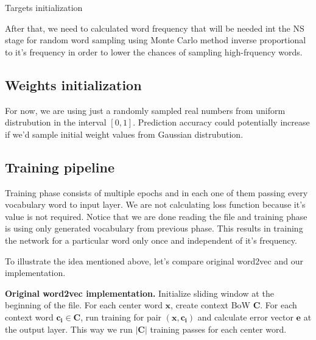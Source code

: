 \documentclass{article}
\newcommand{\SetAlgoStyle}{
	\SetAlgoNoLine
	\SetAlgoNoEnd
	\DontPrintSemicolon
}
\begin{document}
\begin{algorithm}[H]
	\caption{Targets initialization}
	\SetAlgoStyle
\end{algorithm}

\medbreak

After that, we need to calculated word frequency that will be needed
int the NS stage for random word sampling using Monte Carlo method inverse
proportional to it's frequency in order to lower the chances of sampling
high-frquency words.

\subsection{Weights initialization}

For now, we are using just a randomly sampled real numbers from uniform distrubution in the interval
$[0, 1]$. Prediction accuracy could potentially increase if we'd sample initial weight values from Gaussian
distrubution.

\subsection{Training pipeline}

Training phase consists of multiple epochs and in each one of them passing
every vocabulary word to input layer. We are not calculating loss function
because it's value is not required. Notice that we are done reading the file
and training phase is using only generated vocabulary from previous phase.
This results in training the network for a particular word only once and
independent of it's frequency.

\medbreak

To illustrate the idea mentioned above, let's compare original word2vec and our implementation.

\textbf{Original word2vec implementation.}
Initialize sliding window at the beginning of the file. For each center word $\boldsymbol{x}$, create context BoW $\boldsymbol{C}$. For each context word $\boldsymbol{c_i} \in \boldsymbol{C}$, run training for pair $(\boldsymbol{x}, \boldsymbol{c_i})$ and calculate error vector $\boldsymbol{e}$ at the output layer. This way we run $|\boldsymbol{C}|$ training passes for each center word.
\end{document}
